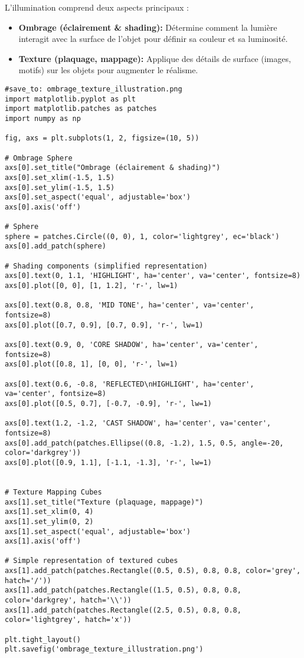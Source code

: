 \documentclass{article}
\begin{document}
L'illumination comprend deux aspects principaux :
\begin{itemize}
    \item \textbf{Ombrage (éclairement \& shading):} Détermine comment la lumière interagit avec la surface de l'objet pour définir sa couleur et sa luminosité.
    \item \textbf{Texture (plaquage, mappage):} Applique des détails de surface (images, motifs) sur les objets pour augmenter le réalisme.
\end{itemize}

\begin{verbatim}
#save_to: ombrage_texture_illustration.png
import matplotlib.pyplot as plt
import matplotlib.patches as patches
import numpy as np

fig, axs = plt.subplots(1, 2, figsize=(10, 5))

# Ombrage Sphere
axs[0].set_title("Ombrage (éclairement & shading)")
axs[0].set_xlim(-1.5, 1.5)
axs[0].set_ylim(-1.5, 1.5)
axs[0].set_aspect('equal', adjustable='box')
axs[0].axis('off')

# Sphere
sphere = patches.Circle((0, 0), 1, color='lightgrey', ec='black')
axs[0].add_patch(sphere)

# Shading components (simplified representation)
axs[0].text(0, 1.1, 'HIGHLIGHT', ha='center', va='center', fontsize=8)
axs[0].plot([0, 0], [1, 1.2], 'r-', lw=1)

axs[0].text(0.8, 0.8, 'MID TONE', ha='center', va='center', fontsize=8)
axs[0].plot([0.7, 0.9], [0.7, 0.9], 'r-', lw=1)

axs[0].text(0.9, 0, 'CORE SHADOW', ha='center', va='center', fontsize=8)
axs[0].plot([0.8, 1], [0, 0], 'r-', lw=1)

axs[0].text(0.6, -0.8, 'REFLECTED\nHIGHLIGHT', ha='center', va='center', fontsize=8)
axs[0].plot([0.5, 0.7], [-0.7, -0.9], 'r-', lw=1)

axs[0].text(1.2, -1.2, 'CAST SHADOW', ha='center', va='center', fontsize=8)
axs[0].add_patch(patches.Ellipse((0.8, -1.2), 1.5, 0.5, angle=-20, color='darkgrey'))
axs[0].plot([0.9, 1.1], [-1.1, -1.3], 'r-', lw=1)


# Texture Mapping Cubes
axs[1].set_title("Texture (plaquage, mappage)")
axs[1].set_xlim(0, 4)
axs[1].set_ylim(0, 2)
axs[1].set_aspect('equal', adjustable='box')
axs[1].axis('off')

# Simple representation of textured cubes
axs[1].add_patch(patches.Rectangle((0.5, 0.5), 0.8, 0.8, color='grey', hatch='/'))
axs[1].add_patch(patches.Rectangle((1.5, 0.5), 0.8, 0.8, color='darkgrey', hatch='\\'))
axs[1].add_patch(patches.Rectangle((2.5, 0.5), 0.8, 0.8, color='lightgrey', hatch='x'))

plt.tight_layout()
plt.savefig('ombrage_texture_illustration.png')

\end{verbatim}
\end{document}
